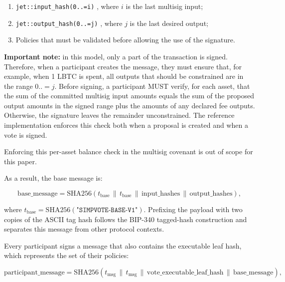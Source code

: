 \documentclass[11pt]{article}
\begin{document}
    \begin{enumerate}
        \item \texttt{jet::input\_hash(0..=i)} \cite{simplicity-input-hash}, where $i$ is the last multisig input;
        \item \texttt{jet::output\_hash(0..=j)} \cite{simplicity-output-hash}, where $j$ is the last desired output;
        \item Policies that must be validated before allowing the use of the signature.
    \end{enumerate}

    \textbf{Important note:} in this model, only a part of the transaction is signed. Therefore, when a participant creates the message, they must ensure that, for example, when 1 LBTC is spent, all outputs that should be constrained are in the range $0..=j$. Before signing, a participant MUST verify, for each asset, that the sum of the committed multisig input amounts equals the sum of the proposed output amounts in the signed range plus the amounts of any declared fee outputs. Otherwise, the signature leaves the remainder unconstrained. The reference implementation enforces this check both when a proposal is created and when a vote is signed.

    Enforcing this per-asset balance check in the multisig covenant is out of scope for this paper.

    As a result, the base message is:

    \begin{equation}
        \mathrm{base\_message}
        =
        \mathrm{SHA256}(
        t_{\mathrm{base}}
        \,\|\,
        t_{\mathrm{base}}
        \,\|\,
        \mathrm{input\_hashes}
        \,\|\,
        \mathrm{output\_hashes}
        ),
    \end{equation}

    where $t_{\mathrm{base}} = \mathrm{SHA256}(\texttt{"SIMPVOTE-BASE-V1"})$. Prefixing the payload with two copies of the ASCII tag hash follows the BIP-340 tagged-hash construction and separates this message from other protocol contexts.

    Every participant signs a message that also contains the executable leaf hash, which represents the set of their policies:

    \begin{equation}
        \mathrm{participant\_message}
        =
        \mathrm{SHA256}(
        t_{\mathrm{msg}}
        \,\|\,
        t_{\mathrm{msg}}
        \,\|\,
        \mathrm{vote\_executable\_leaf\_hash}
        \,\|\,
        \mathrm{base\_message}
        ),
    \end{equation}
\end{document}
